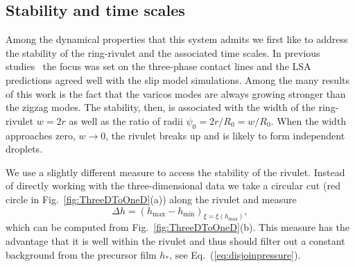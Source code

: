 \documentclass[twoside,twocolumn,9pt]{article}
\begin{document}
\subsection{Stability and time scales}\label{subsec:stability}
Among the dynamical properties that this system admits we first like to address the stability of the ring-rivulet and the associated time scales.
In previous studies~\cite{gonzalezStabilityLiquidRing2013} the focus was set on the three-phase contact lines and the LSA predictions agreed well with the slip model simulations.
Among the many results of this work is the fact that the varicos modes are always growing stronger than the zigzag modes.
The stability, then, is associated with the width of the ring-rivulet $w = 2r$ as well as the ratio of radii $\psi_0 = 2r/R_0 = w/R_0$.
When the width approaches zero, $w \rightarrow 0$, the rivulet breaks up and is likely to form independent droplets.

We use a slightly different measure to access the stability of the rivulet. 
Instead of directly working with the three-dimensional data we take a circular cut (red circle in Fig.~\ref{fig:ThreeDToOneD}(a)) along the rivulet and measure
\begin{equation}\label{eq:delta-h-measure}
    \Delta h = (h_{\max} - h_{\min})_{\xi = \xi(h_{\max})},
\end{equation}
which can be computed from Fig.~\ref{fig:ThreeDToOneD}(b).
This measure has the advantage that it is well within the rivulet and thus should filter out a constant background from the precursor film $h_{\ast}$, see Eq.~(\ref{eq:disjoinpressure}).
\end{document}

